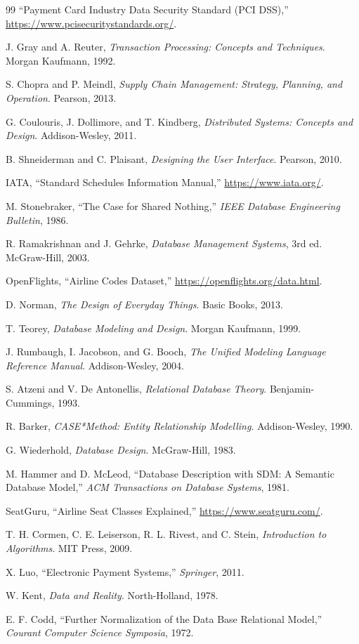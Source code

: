 \documentclass[12pt, a4paper]{article}
\begin{document}
\begin{thebibliography}{99}
		 ``Payment Card Industry Data Security Standard (PCI DSS),'' \url{https://www.pcisecuritystandards.org/}.
		
		 J. Gray and A. Reuter, \textit{Transaction Processing: Concepts and Techniques}. Morgan Kaufmann, 1992.
		
		 S. Chopra and P. Meindl, \textit{Supply Chain Management: Strategy, Planning, and Operation}. Pearson, 2013.
		
		 G. Coulouris, J. Dollimore, and T. Kindberg, \textit{Distributed Systems: Concepts and Design}. Addison-Wesley, 2011.
		
		 B. Shneiderman and C. Plaisant, \textit{Designing the User Interface}. Pearson, 2010.
		
		 IATA, ``Standard Schedules Information Manual,'' \url{https://www.iata.org/}.
		
		 M. Stonebraker, ``The Case for Shared Nothing,'' \textit{IEEE Database Engineering Bulletin}, 1986.
		
		 R. Ramakrishnan and J. Gehrke, \textit{Database Management Systems}, 3rd ed. McGraw-Hill, 2003.
		
		 OpenFlights, ``Airline Codes Dataset,'' \url{https://openflights.org/data.html}.
		
		 D. Norman, \textit{The Design of Everyday Things}. Basic Books, 2013.
		
		 T. Teorey, \textit{Database Modeling and Design}. Morgan Kaufmann, 1999.
		
		 J. Rumbaugh, I. Jacobson, and G. Booch, \textit{The Unified Modeling Language Reference Manual}. Addison-Wesley, 2004.
		
		 S. Atzeni and V. De Antonellis, \textit{Relational Database Theory}. Benjamin-Cummings, 1993.
		
		 R. Barker, \textit{CASE*Method: Entity Relationship Modelling}. Addison-Wesley, 1990.
		
		 G. Wiederhold, \textit{Database Design}. McGraw-Hill, 1983.
		
		 M. Hammer and D. McLeod, ``Database Description with SDM: A Semantic Database Model,'' \textit{ACM Transactions on Database Systems}, 1981.
		
		 SeatGuru, ``Airline Seat Classes Explained,'' \url{https://www.seatguru.com/}.
		
		 T. H. Cormen, C. E. Leiserson, R. L. Rivest, and C. Stein, \textit{Introduction to Algorithms}. MIT Press, 2009.
		
		 X. Luo, ``Electronic Payment Systems,'' \textit{Springer}, 2011.
		
		 W. Kent, \textit{Data and Reality}. North-Holland, 1978.
		
		 E. F. Codd, ``Further Normalization of the Data Base Relational Model,'' \textit{Courant Computer Science Symposia}, 1972.
		
	\end{thebibliography}
	
\end{document}
